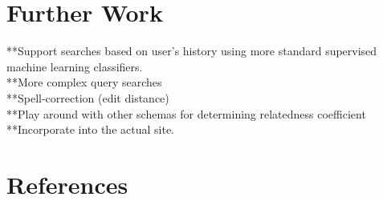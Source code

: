 \documentclass[12pt]{article}
\begin{document}
\section*{Further Work}
**Support searches based on user's history using more standard supervised machine learning classifiers.\\
	**More complex query searches\\
	**Spell-correction (edit distance)\\
	**Play around with other schemas for determining relatedness coefficient\\
	**Incorporate into the actual site.\\

\section*{References}
\end{document}
